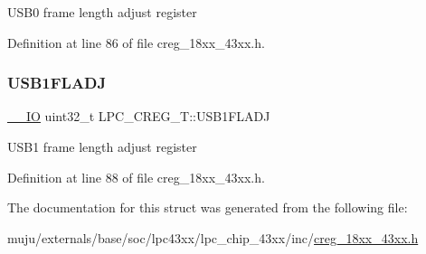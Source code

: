 U\+S\+B0 frame length adjust register 

Definition at line 86 of file creg\+\_\+18xx\+\_\+43xx.\+h.

\mbox{\label{struct_l_p_c___c_r_e_g___t_a322bbd6d33c40f51247772b994270f0c}} 
\subsubsection{\texorpdfstring{U\+S\+B1\+F\+L\+A\+DJ}{USB1FLADJ}}
{\footnotesize\ttfamily \hyperlink{core__sc300_8h_aec43007d9998a0a0e01faede4133d6be}{\+\_\+\+\_\+\+IO} uint32\+\_\+t L\+P\+C\+\_\+\+C\+R\+E\+G\+\_\+\+T\+::\+U\+S\+B1\+F\+L\+A\+DJ}

U\+S\+B1 frame length adjust register 

Definition at line 88 of file creg\+\_\+18xx\+\_\+43xx.\+h.



The documentation for this struct was generated from the following file\+:\begin{DoxyCompactItemize}
\item 
muju/externals/base/soc/lpc43xx/lpc\+\_\+chip\+\_\+43xx/inc/\hyperlink{creg__18xx__43xx_8h}{creg\+\_\+18xx\+\_\+43xx.\+h}\end{DoxyCompactItemize}
